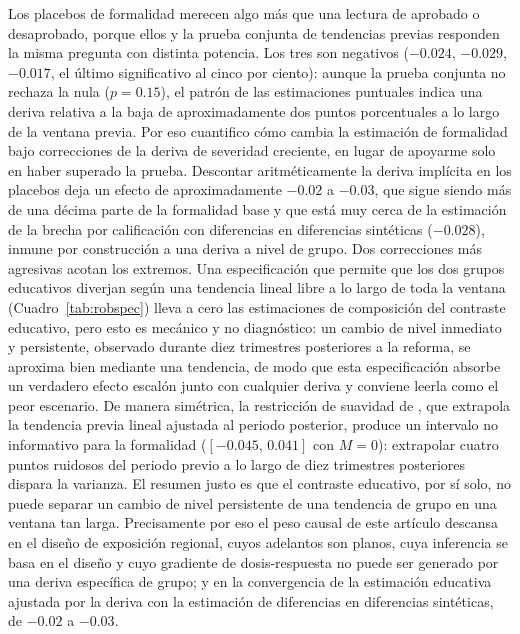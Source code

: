 Los placebos de formalidad merecen algo más que una lectura de aprobado o desaprobado, porque ellos y la prueba conjunta de tendencias previas responden la misma pregunta con distinta potencia. Los tres son negativos ($-0.024$, $-0.029$, $-0.017$, el último significativo al cinco por ciento): aunque la prueba conjunta no rechaza la nula ($p=0.15$), el patrón de las estimaciones puntuales indica una deriva relativa a la baja de aproximadamente dos puntos porcentuales a lo largo de la ventana previa. Por eso cuantifico cómo cambia la estimación de formalidad bajo correcciones de la deriva de severidad creciente, en lugar de apoyarme solo en haber superado la prueba. Descontar aritméticamente la deriva implícita en los placebos deja un efecto de aproximadamente $-0.02$ a $-0.03$, que sigue siendo más de una décima parte de la formalidad base y que está muy cerca de la estimación de la brecha por calificación con diferencias en diferencias sintéticas ($-0.028$), inmune por construcción a una deriva a nivel de grupo. Dos correcciones más agresivas acotan los extremos. Una especificación que permite que los dos grupos educativos diverjan según una tendencia lineal libre a lo largo de toda la ventana (Cuadro~\ref{tab:robspec}) lleva a cero las estimaciones de composición del contraste educativo, pero esto es mecánico y no diagnóstico: un cambio de nivel inmediato y persistente, observado durante diez trimestres posteriores a la reforma, se aproxima bien mediante una tendencia, de modo que esta especificación absorbe un verdadero efecto escalón junto con cualquier deriva y conviene leerla como el peor escenario. De manera simétrica, la restricción de suavidad de \citet{rambachan_roth_2023}, que extrapola la tendencia previa lineal ajustada al periodo posterior, produce un intervalo no informativo para la formalidad ($[-0.045,\,0.041]$ con $M=0$): extrapolar cuatro puntos ruidosos del periodo previo a lo largo de diez trimestres posteriores dispara la varianza. El resumen justo es que el contraste educativo, por sí solo, no puede separar un cambio de nivel persistente de una tendencia de grupo en una ventana tan larga. Precisamente por eso el peso causal de este artículo descansa en el diseño de exposición regional, cuyos adelantos son planos, cuya inferencia se basa en el diseño y cuyo gradiente de dosis-respuesta no puede ser generado por una deriva específica de grupo; y en la convergencia de la estimación educativa ajustada por la deriva con la estimación de diferencias en diferencias sintéticas, de $-0.02$ a $-0.03$.

